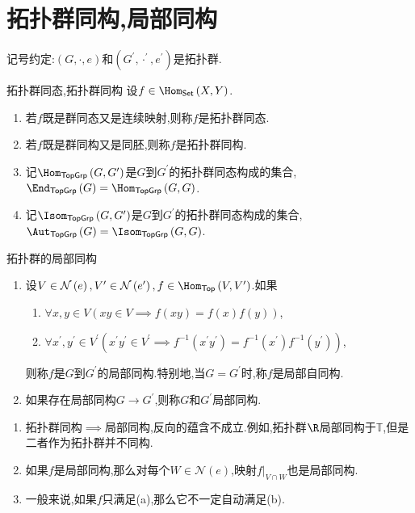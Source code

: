 \section{拓扑群同构,局部同构}

记号约定:$\left(G,\cdot,e\right)$和$\left(G^{\prime},\cdot^{\prime},e^{\prime}\right)$是拓扑群.

\begin{definition}{拓扑群同态,拓扑群同构}{}
	设$f\in\Hom_{\mathsf{Set}}\left(X,Y\right)$.
	\begin{enumerate}
		\item 若$f$既是群同态又是连续映射,则称$f$是拓扑群同态.
		\item 若$f$既是群同构又是同胚,则称$f$是拓扑群同构.
		\item 记$\Hom_{\mathsf{TopGrp}}\left(G,G^{\prime}\right)$是$G$到$G^{\prime}$的拓扑群同态构成的集合,$\End_{\mathsf{TopGrp}}\left(G\right)=\Hom_{\mathsf{TopGrp}}\left(G,G\right)$.
		\item 记$\Isom_{\mathsf{TopGrp}}\left(G,G^{\prime}\right)$是$G$到$G^{\prime}$的拓扑群同态构成的集合,$\Aut_{\mathsf{TopGrp}}\left(G\right)=\Isom_{\mathsf{TopGrp}}\left(G,G\right)$.
	\end{enumerate}
\end{definition}

\begin{definition}{拓扑群的局部同构}{}
	\begin{enumerate}
		\item 设$V\in\mathcal{N}\left(e\right),V^{\prime}\in\mathcal{N}\left(e^{\prime}\right),f\in\Hom_{\mathsf{Top}}\left(V,V^{\prime}\right)$.如果
		\begin{enumerate}
			\item $\forall x,y\in V\left(xy\in V\implies f\left(xy\right)=f\left(x\right)f\left(y\right)\right)$,
			\item $\forall x^{\prime},y^{\prime}\in V^{\prime}\left(x^{\prime}y^{\prime}\in V^{\prime}\implies f^{-1}\left(x^{\prime}y^{\prime}\right)=f^{-1}\left(x^{\prime}\right)f^{-1}\left(y^{\prime}\right)\right)$,
		\end{enumerate}
		则称$f$是$G$到$G^{\prime}$的局部同构.特别地,当$G=G^{\prime}$时,称$f$是局部自同构.
		\item 如果存在局部同构$G\to G^{\prime}$,则称$G$和$G^{\prime}$局部同构.
	\end{enumerate}
\end{definition}

\begin{remark}{}{}
	\begin{enumerate}
		\item 拓扑群同构$\implies$局部同构,反向的蕴含不成立.例如,拓扑群$\R$局部同构于$\mathbb{T}$,但是二者作为拓扑群并不同构.
		\item 如果$f$是局部同构,那么对每个$W\in\mathcal{N}\left(e\right)$,映射$f|_{V\cap W}$也是局部同构.
		\item 一般来说,如果$f$只满足(a),那么它不一定自动满足(b).
	\end{enumerate}
\end{remark}

